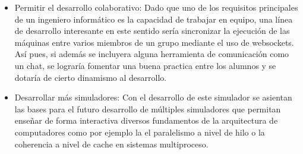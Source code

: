 \begin{itemize}
\item Permitir el desarrollo colaborativo: Dado que uno de los requisitos principales de un 
ingeniero informático es la capacidad de trabajar en equipo, una línea de desarrollo interesante
en este sentido sería sincronizar la ejecución de las máquinas entre varios miembros de un grupo
mediante el uso de websockets. Así pues, si además se incluyera alguna herramienta de comunicación
 como un chat, se lograría fomentar una buena practica entre los alumnos y se dotaría de cierto
 dinamismo al desarrollo.

\item Desarrollar más simuladores: Con el desarrollo de este simulador se asientan las bases para
el futuro desarrollo de múltiples simuladores que permitan enseñar de forma interactiva
diversos fundamentos de la arquitectura de computadores como por ejemplo la el paralelismo a nivel 
de hilo o la coherencia a nivel de cache en sistemas multiproceso.

\end{itemize}